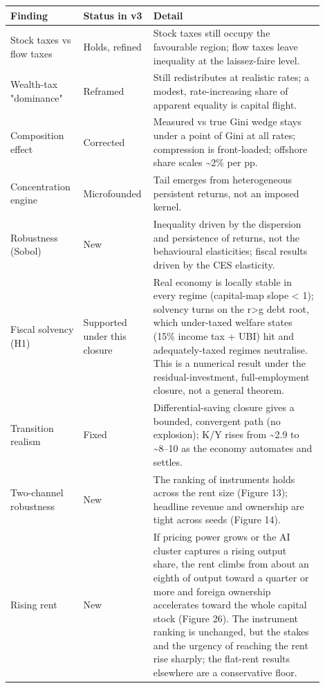 \documentclass[12pt]{article}
\begin{document}
\begin{longtable}[]{@{}>{\raggedright\arraybackslash}p{0.22\linewidth}>{\raggedright\arraybackslash}p{0.16\linewidth}>{\raggedright\arraybackslash}p{0.52\linewidth}@{}}
\toprule\noalign{}
Finding & Status in v3 & Detail \\
\midrule\noalign{}
\endhead
\bottomrule\noalign{}
\endlastfoot
Stock taxes vs flow taxes & Holds, refined & Stock taxes still occupy
the favourable region; flow taxes leave inequality at the laissez-faire
level. \\
Wealth-tax "dominance" & Reframed & Still redistributes at realistic
rates; a modest, rate-increasing share of apparent equality is capital
flight. \\
Composition effect & Corrected & Measured vs true Gini wedge stays under
a point of Gini at all rates; compression is front-loaded; offshore
share scales \textasciitilde2\% per pp. \\
Concentration engine & Microfounded & Tail emerges from heterogeneous
persistent returns, not an imposed kernel. \\
Robustness (Sobol) & New & Inequality driven by the dispersion and
persistence of returns, not the behavioural elasticities; fiscal results
driven by the CES elasticity. \\
Fiscal solvency (H1) & Supported under this closure & Real economy is
locally stable in every regime (capital-map slope \textless{} 1);
solvency turns on the r\textgreater g debt root, which under-taxed
welfare states (15\% income tax + UBI) hit and adequately-taxed regimes
neutralise. This is a numerical result under the residual-investment,
full-employment closure, not a general theorem. \\
Transition realism & Fixed & Differential-saving closure gives a
bounded, convergent path (no explosion); K/Y rises from
\textasciitilde2.9 to \textasciitilde8--10 as the economy automates and
settles. \\
Two-channel robustness & New & The ranking of instruments holds across
the rent size (Figure 13); headline revenue and ownership are tight
across seeds (Figure 14). \\
Rising rent & New & If pricing power grows or the AI cluster captures a
rising output share, the rent climbs from about an eighth of output
toward a quarter or more and foreign ownership accelerates toward the
whole capital stock (Figure 26). The instrument ranking is unchanged,
but the stakes and the urgency of reaching the rent rise sharply; the
flat-rent results elsewhere are a conservative floor. \\

\end{longtable}
\end{document}
